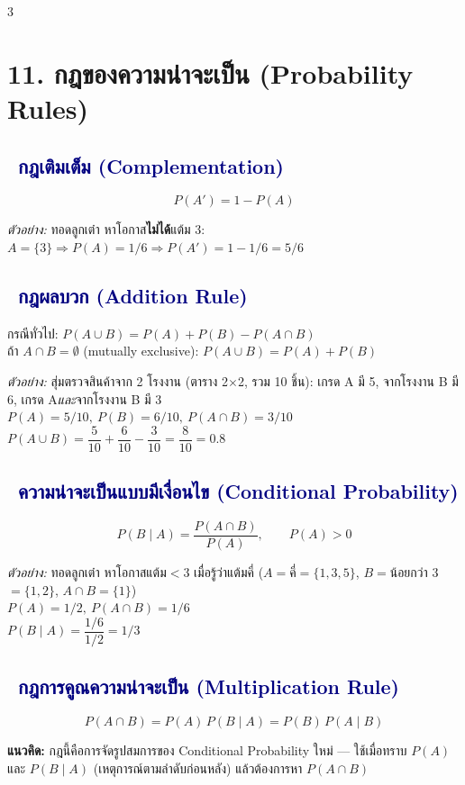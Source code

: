 \documentclass[9pt]{extarticle}
\newcommand{\dist}[1]{\subsection*{\textcolor{navy}{\textbullet\ #1}}}
\begin{document}
\begin{multicols}{3}
\section*{11. กฎของความน่าจะเป็น (Probability Rules)}
\dist{กฎเติมเต็ม (Complementation)}
\begin{formulabox}
$$P(A')=1-P(A)$$
\end{formulabox}
\begin{solbox}
\textit{ตัวอย่าง:} ทอดลูกเต๋า หาโอกาส\textbf{ไม่ได้}แต้ม 3: $A=\{3\}\Rightarrow P(A)=1/6\Rightarrow P(A')=1-1/6=5/6$
\end{solbox}

\dist{กฎผลบวก (Addition Rule)}
\begin{formulabox}
กรณีทั่วไป: $P(A\cup B)=P(A)+P(B)-P(A\cap B)$\\
ถ้า $A\cap B=\emptyset$ (mutually exclusive): $P(A\cup B)=P(A)+P(B)$
\end{formulabox}
\begin{solbox}
\textit{ตัวอย่าง:} สุ่มตรวจสินค้าจาก 2 โรงงาน (ตาราง 2$\times$2, รวม 10 ชิ้น): เกรด A มี 5, จากโรงงาน B มี 6, เกรด A\textit{และ}จากโรงงาน B มี 3\\
$P(A)=5/10,\ P(B)=6/10,\ P(A\cap B)=3/10$\\
$P(A\cup B)=\dfrac{5}{10}+\dfrac{6}{10}-\dfrac{3}{10}=\dfrac{8}{10}=0.8$
\end{solbox}

\dist{ความน่าจะเป็นแบบมีเงื่อนไข (Conditional Probability)}
\begin{formulabox}
$$P(B\mid A)=\frac{P(A\cap B)}{P(A)},\qquad P(A)>0$$
\end{formulabox}
\begin{solbox}
\textit{ตัวอย่าง:} ทอดลูกเต๋า หาโอกาสแต้ม$<3$ เมื่อรู้ว่าแต้มคี่ ($A=$คี่$=\{1,3,5\}$, $B=$น้อยกว่า 3$=\{1,2\}$, $A\cap B=\{1\}$)\\
$P(A)=1/2,\ P(A\cap B)=1/6$\\
$P(B\mid A)=\dfrac{1/6}{1/2}=1/3$
\end{solbox}

\dist{กฎการคูณความน่าจะเป็น (Multiplication Rule)}
\begin{formulabox}
$$P(A\cap B)=P(A)\,P(B\mid A)=P(B)\,P(A\mid B)$$
\end{formulabox}
\begin{ideabox}
\textbf{แนวคิด:} กฎนี้คือการจัดรูปสมการของ Conditional Probability ใหม่ — ใช้เมื่อทราบ $P(A)$ และ $P(B\mid A)$ (เหตุการณ์ตามลำดับก่อนหลัง) แล้วต้องการหา $P(A\cap B)$
\end{ideabox}


\end{multicols}
\end{document}
